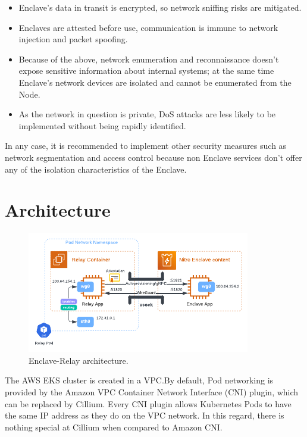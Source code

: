 \documentclass[a4paper, twocolumn]{article}
\begin{document}
\begin{itemize}

\item Enclave's data in transit is encrypted, so network sniffing risks are
mitigated.

\item Enclaves are attested before use, communication is immune to network
injection and packet spoofing.

\item Because of the above, network enumeration and reconnaissance doesn't
expose sensitive information about internal systems; at the same time Enclave's
network devices are isolated and cannot be enumerated from the Node.

\item As the network in question is private, DoS attacks are less likely to be
implemented without being rapidly identified.

\end{itemize}

In any case, it is recommended to implement other security measures such as
network segmentation and access control because non Enclave services don't
offer any of the isolation characteristics of the Enclave.

\section{Architecture}

\begin{figure}
  \centering
  \includegraphics[width=\linewidth,keepaspectratio]{architecture.pdf}
  \caption{Enclave-Relay architecture.}\label{fig:arch1}
\end{figure}

The AWS EKS cluster is created in a VPC.\@ By default, Pod networking is
provided by the Amazon VPC Container Network Interface (CNI) plugin, which can
be replaced by Cillium. Every CNI plugin allows Kubernetes Pods to have the
same IP address as they do on the VPC network. In this regard, there is nothing
special at Cillium when compared to Amazon CNI.\@
\end{document}
